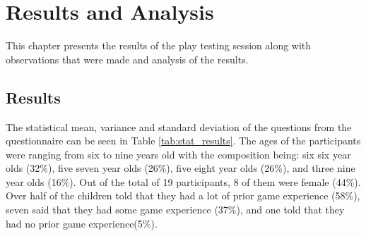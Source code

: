 \chapter{Results and Analysis}
This chapter presents the results of the play testing session along with observations that were made and analysis of the results.


\section{Results}
The statistical mean, variance and standard deviation of the questions from the questionnaire can be seen in Table \ref{tab:stat_results}. The ages of the participants were ranging from six to nine years old with the composition being: six six year olds (32\%), five seven year olds (26\%), five eight year olds (26\%), and three nine year olds (16\%). Out of the total of 19 participants, 8 of them were female (44\%). Over half of the children told that they had a lot of prior game experience (58\%), seven said that they had some game experience (37\%), and one told that they had no prior game experience(5\%).


